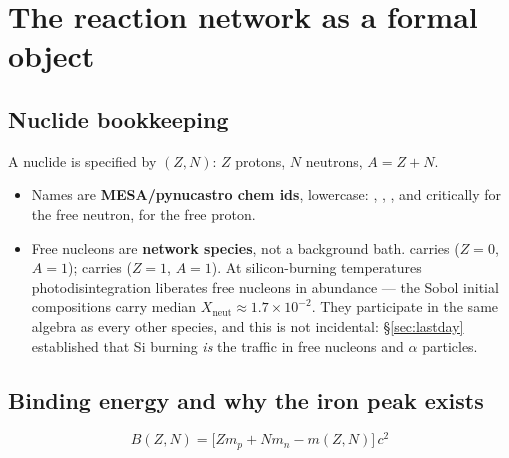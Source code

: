 \section{The reaction network as a formal object}
\label{part:network}

\subsection{Nuclide bookkeeping}
\label{sec:bookkeeping}

A nuclide is specified by $(Z, N)$: $Z$ protons, $N$ neutrons, $A = Z + N$.

\begin{itemize}
\item Names are \textbf{MESA/pynucastro chem ids}, lowercase: ,
      , , and critically  for the free neutron,
       for the free proton.
\item Free nucleons are \textbf{network species}, not a background bath.
       carries ($Z=0$, $A=1$);  carries ($Z=1$, $A=1$). At
      silicon-burning temperatures photodisintegration liberates free nucleons
      in abundance --- the Sobol initial compositions carry median
      $X_{\mathrm{neut}} \approx 1.7\times10^{-2}$. They participate in the
      same algebra as every other species, and this is not incidental:
      \S\ref{sec:lastday} established that Si burning \emph{is} the traffic in
      free nucleons and $\alpha$ particles.
\end{itemize}

\subsection{Binding energy and why the iron peak exists}
\label{sec:bindingenergy}

\begin{equation*}
B(Z,N) = \bigl[Z m_p + N m_n - m(Z,N)\bigr]\,c^2
\end{equation*}

